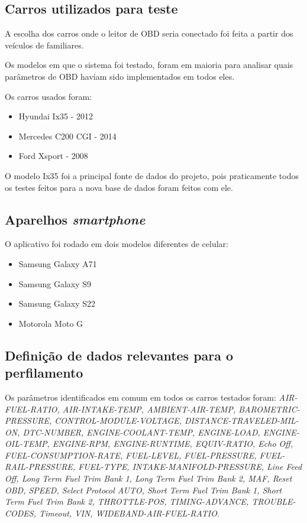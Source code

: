 \subsection{Carros utilizados para teste}

    A escolha dos carros onde o leitor de OBD seria conectado foi feita a partir dos veículos de familiares.

    Os modelos em que o sistema foi testado, foram em maioria para analisar quais parâmetros de OBD haviam sido implementados em todos eles.

    Os carros usados foram:

    \begin{itemize}
        \item Hyundai Ix35 - 2012
        \item Mercedes C200 CGI - 2014
        \item Ford Xsport - 2008
    \end{itemize}

    

    O modelo Ix35 foi a principal fonte de dados do projeto, pois praticamente todos os testes feitos para a nova base de dados foram feitos com ele.

    \subsection{Aparelhos \textit{smartphone}}

    O aplicativo foi rodado em dois modelos diferentes de celular:
    \begin{itemize}
        \item Samsung Galaxy A71
        \item Samsung Galaxy S9
        \item Samsung Galaxy S22
        \item Motorola Moto G
    \end{itemize}

\subsection{Definição de dados relevantes para o perfilamento}

    Os parâmetros identificados em comum em todos os carros testados foram: \textit{AIR-FUEL-RATIO, AIR-INTAKE-TEMP, AMBIENT-AIR-TEMP, BAROMETRIC-PRESSURE, CONTROL-MODULE-VOLTAGE, DISTANCE-TRAVELED-MIL-ON, DTC-NUMBER, ENGINE-COOLANT-TEMP, ENGINE-LOAD, ENGINE-OIL-TEMP, ENGINE-RPM, ENGINE-RUNTIME, EQUIV-RATIO, Echo Off, FUEL-CONSUMPTION-RATE, FUEL-LEVEL, FUEL-PRESSURE, FUEL-RAIL-PRESSURE, FUEL-TYPE, INTAKE-MANIFOLD-PRESSURE, Line Feed Off, Long Term Fuel Trim Bank 1, Long Term Fuel Trim Bank 2, MAF, Reset OBD, SPEED, Select Protocol AUTO, Short Term Fuel Trim Bank 1, Short Term Fuel Trim Bank 2, THROTTLE-POS, TIMING-ADVANCE, TROUBLE-CODES, Timeout, VIN, WIDEBAND-AIR-FUEL-RATIO}.

